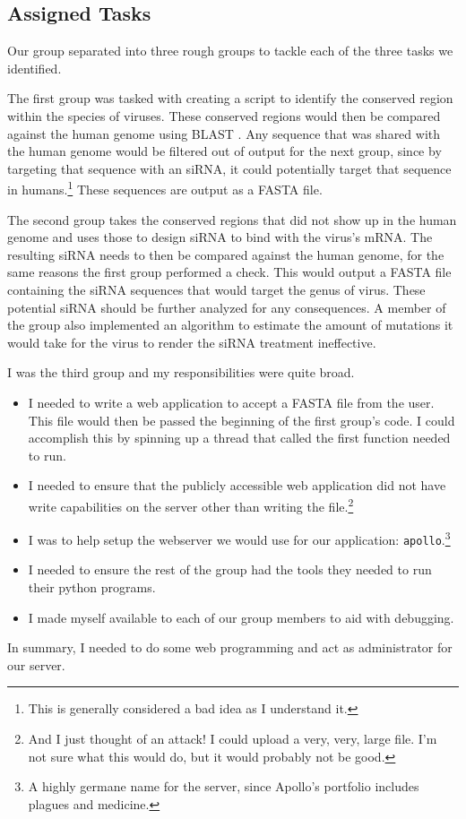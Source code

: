 \documentclass[10pt,letterpaper]{article}
\begin{document}
\subsection{Assigned Tasks}
Our group separated into three rough groups to tackle each of the three tasks we identified.

The first group was tasked with creating a script to identify the conserved region within the species of viruses.
These conserved regions would then be compared against the human genome using BLAST \cite{blast}.
Any sequence that was shared with the human genome would be filtered out of output for the next group, since by targeting that sequence with an siRNA, it could potentially target that sequence in humans.\footnote{This is generally considered a bad idea as I understand it.}
These sequences are output as a FASTA file.

The second group takes the conserved regions that did not show up in the human genome and uses those to design siRNA to bind with the virus's mRNA.
The resulting siRNA needs to then be compared against the human genome, for the same reasons the first group performed a check.
This would output a FASTA file containing the siRNA sequences that would target the genus of virus.
These potential siRNA should be further analyzed for any consequences.
A member of the group also implemented an algorithm to estimate the amount of mutations it would take for the virus to render the siRNA treatment ineffective.


I was the third group and my responsibilities were quite broad.
\begin{itemize}
	\item I needed to write a web application to accept a FASTA file from the user.
	This file would then be passed the beginning of the first group's code. 
	I could accomplish this by spinning up a thread that called the first function needed to run.
	\item I needed to ensure that the publicly accessible web application did not have write capabilities on the server other than writing the file.\footnote{And I just thought of an attack!  I could upload a very, very, large file.  I'm not sure what this would do, but it would probably not be good.} 
	\item I was to help setup the webserver we would use for our application: \texttt{apollo}.\footnote{A highly germane name for the server, since Apollo's portfolio includes plagues and medicine.}
	\item I needed to ensure the rest of the group had the tools they needed to run their python programs.
	\item I made myself available to each of our group members to aid with debugging.
\end{itemize}
In summary, I needed to do some web programming and act as administrator for our server.
\end{document}
